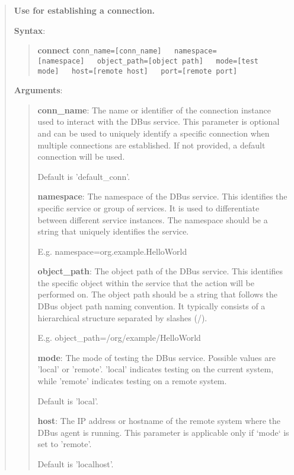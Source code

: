 \begin{quote}
\textbf{Use for establishing a connection.}

\textbf{Syntax}:

\begin{quote}
\textbf{connect}
\texttt{conn\_name={[}conn\_name{]}\ \ \ namespace={[}namespace{]}\ \ \ object\_path={[}object path{]}\ \ \ mode={[}test mode{]}\ \ \ host={[}remote host{]}\ \ \ port={[}remote port{]}}
\end{quote}

\textbf{Arguments}:

\begin{quote}
\textbf{conn\_name}: The name or identifier of the connection instance used to interact with the DBus service.
  This parameter is optional and can be used to uniquely identify a specific connection
  when multiple connections are established. If not provided, a default connection will be used.

  Default is 'default\_conn'.

\vspace{\baselineskip}

\textbf{namespace}: The namespace of the DBus service.
  This identifies the specific service or group of services.
  It is used to differentiate between different service instances.
  The namespace should be a string that uniquely identifies the service.

  E.g. namespace=org.example.HelloWorld

\vspace{\baselineskip}

\textbf{object\_path}: The object path of the DBus service.
  This identifies the specific object within the service that the action will be performed on.
  The object path should be a string that follows the DBus object path naming convention.
  It typically consists of a hierarchical structure separated by slashes (/).

  E.g. object\_path=/org/example/HelloWorld

\vspace{\baselineskip}

\textbf{mode}: The mode of testing the DBus service. Possible values are 'local' or 'remote'.
  'local' indicates testing on the current system, while 'remote' indicates testing on a remote system.

  Default is 'local'.

\vspace{\baselineskip}

\textbf{host}: The IP address or hostname of the remote system where the DBus agent is running.
                 This parameter is applicable only if `mode` is set to 'remote'.

				 Default is 'localhost'.
\end{quote}
\end{quote}

